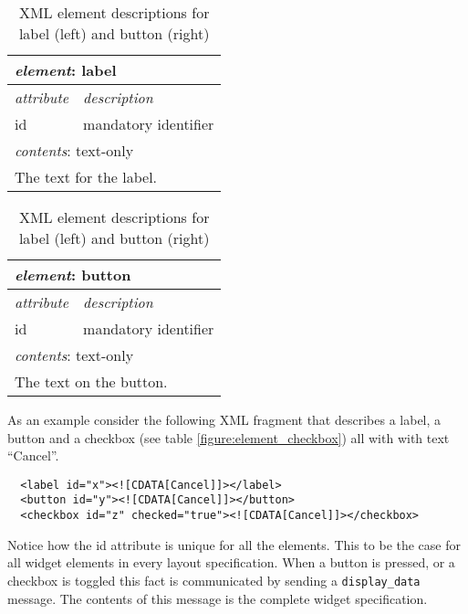 \documentclass{article}
\newcommand{\msg}[1]{\texttt{#1}}
\begin{document}
    \begin{table}[H]
     \begin{center}
     \begin{tabular}{|l|l|}
       \hline
        \multicolumn{2}{|l|}{\textit{element}: label} \\
       \hline \hline
        \textit{attribute} & \textit{description} \\
       \hline
        id                 & mandatory identifier \\
       \hline \hline
        \multicolumn{2}{|l|}{\textit{contents}: text-only} \\
       \hline
         \multicolumn{2}{|l|}{The text for the label.} \\
       \hline
     \end{tabular}
     \begin{tabular}{|l|l|}
       \hline
        \multicolumn{2}{|l|}{\textit{element}: button} \\
       \hline \hline
        \textit{attribute} & \textit{description} \\
       \hline
        id                 & mandatory identifier \\
       \hline \hline
        \multicolumn{2}{|l|}{\textit{contents}: text-only} \\
       \hline
         \multicolumn{2}{|l|}{The text on the button.} \\
       \hline
     \end{tabular}
     \end{center}
     \caption{XML element descriptions for label (left) and button (right)}
    \end{table}

    \noindent As an example consider the following XML fragment that describes
    a label, a button and a checkbox (see table \ref{figure:element_checkbox}) all
    with with text ``Cancel''.
    \small \begin{verbatim}
  <label id="x"><![CDATA[Cancel]]></label>
  <button id="y"><![CDATA[Cancel]]></button>
  <checkbox id="z" checked="true"><![CDATA[Cancel]]></checkbox>\end{verbatim}
  \normalsize
    Notice how the id attribute is unique for all the elements. This to be the
    case for all widget elements in every layout specification. When a button
    is pressed, or a checkbox is toggled this fact is communicated by sending a
    \msg{display\_data} message. The contents of this message is the complete
    widget specification.
\end{document}
